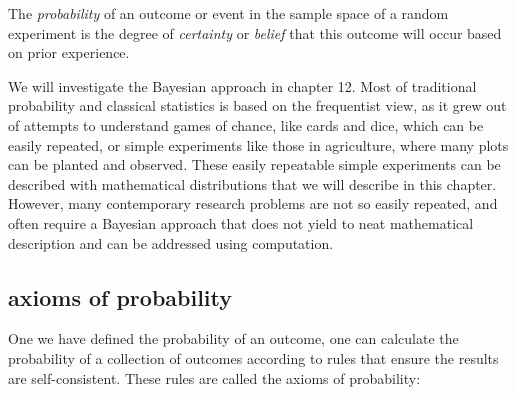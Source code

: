 \documentclass[
  letterpaper,
  DIV=11,
  numbers=noendperiod]{scrreprt}
\begin{document}
\begin{tcolorbox}[enhanced jigsaw, arc=.35mm, colframe=quarto-callout-note-color-frame, left=2mm, opacitybacktitle=0.6, breakable, title=\textcolor{quarto-callout-note-color}{\faInfo}\hspace{0.5em}{Definition}, toprule=.15mm, coltitle=black, bottomtitle=1mm, toptitle=1mm, colback=white, leftrule=.75mm, colbacktitle=quarto-callout-note-color!10!white, titlerule=0mm, opacityback=0, rightrule=.15mm, bottomrule=.15mm]

The \emph{probability} of an outcome or event in the sample space of a
random experiment is the degree of \emph{certainty} or \emph{belief}
that this outcome will occur based on prior experience.

\end{tcolorbox}

We will investigate the Bayesian approach in chapter 12. Most of
traditional probability and classical statistics is based on the
frequentist view, as it grew out of attempts to understand games of
chance, like cards and dice, which can be easily repeated, or simple
experiments like those in agriculture, where many plots can be planted
and observed. These easily repeatable simple experiments can be
described with mathematical distributions that we will describe in this
chapter. However, many contemporary research problems are not so easily
repeated, and often require a Bayesian approach that does not yield to
neat mathematical description and can be addressed using computation.

\hypertarget{axioms-of-probability}{%
\subsection{axioms of probability}\label{axioms-of-probability}}

One we have defined the probability of an outcome, one can calculate the
probability of a collection of outcomes according to rules that ensure
the results are self-consistent. These rules are called the axioms of
probability:
\end{document}

